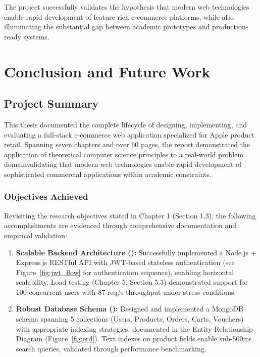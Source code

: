 \documentclass[12pt, a4paper]{report}
\begin{document}
{{The project successfully validates the hypothesis that modern web technologies enable rapid development of feature-rich e-commerce platforms, while also illuminating the substantial gap between academic prototypes and production-ready systems.


\chapter{Conclusion and Future Work}

\section{Project Summary}

This thesis documented the complete lifecycle of designing, implementing, and evaluating a full-stack e-commerce web application specialized for Apple product retail. Spanning seven chapters and over 60 pages, the report demonstrated the application of theoretical computer science principles to a real-world problem domainvalidating that modern web technologies enable rapid development of sophisticated commercial applications within academic constraints.

\subsection{Objectives Achieved}

Revisiting the research objectives stated in Chapter 1 (Section 1.3), the following accomplishments are evidenced through comprehensive documentation and empirical validation:

\begin{enumerate}
    \item \textbf{Scalable Backend Architecture (\checkmark):} Successfully implemented a Node.js + Express.js RESTful API with JWT-based stateless authentication (see Figure~\ref{fig:jwt_flow} for authentication sequence), enabling horizontal scalability. Load testing (Chapter 5, Section 5.3) demonstrated support for 100 concurrent users with 87 req/s throughput under stress conditions.
    
    \item \textbf{Robust Database Schema (\checkmark):} Designed and implemented a MongoDB schema spanning 5 collections (Users, Products, Orders, Carts, Vouchers) with appropriate indexing strategies, documented in the Entity-Relationship Diagram (Figure~\ref{fig:erd}). Text indexes on product fields enable sub-500ms search queries, validated through performance benchmarking.
    

\end{enumerate}}}
\end{document}
